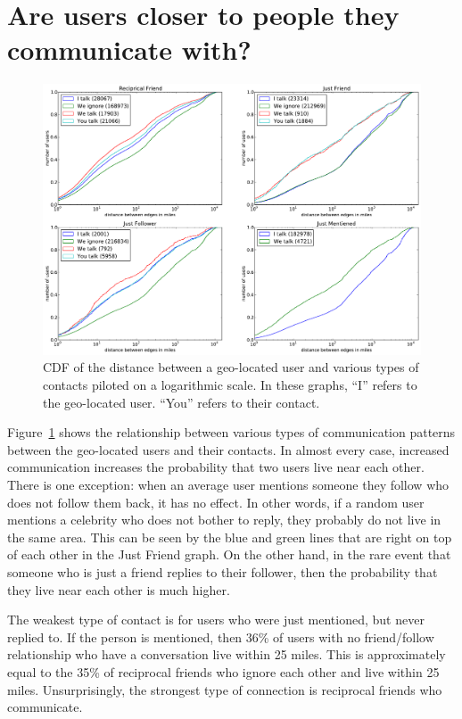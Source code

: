 \section{Are users closer to people they communicate with?}

\begin{figure}[tb]
\centering
\includegraphics[width=\linewidth]{figures/com_types.pdf}
\caption{
CDF of the distance between a geo-located user and various types of contacts
piloted on a logarithmic scale.
In these graphs, ``I'' refers to the geo-located user. ``You'' refers to their
contact.
}
\label{fig:ComTypes}
\end{figure}

Figure~\ref{fig:ComTypes} shows the relationship between various types of
communication patterns between the geo-located users and their contacts.
In almost every case, increased communication increases the probability that
two users live near each other.
There is one exception: when an average user mentions someone they follow who
does not follow them back, it has no effect.
In other words, if a random user mentions a celebrity who does not bother to
reply, they probably do not live in the same area. This can be seen by the blue
and green lines that are right on top of each other in the Just Friend graph.
On the other hand, in the rare event that someone who is just a friend replies
to their follower, then the probability that they live near each other is much
higher.

The weakest type of contact is for users who were just mentioned, but never
replied to. If the person is mentioned, then 36\% of users with no
friend/follow relationship who have a conversation live within 25 miles.
This is approximately equal to the 35\% of reciprocal friends who ignore each
other and live within 25 miles.
Unsurprisingly, the strongest type of connection is reciprocal friends who
communicate.


